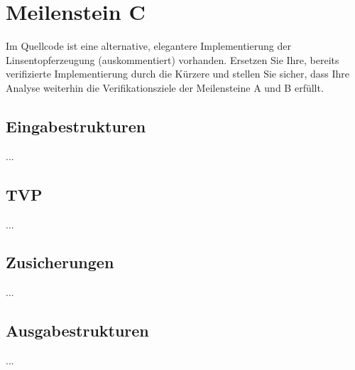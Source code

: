 \section{Meilenstein C}
Im Quellcode ist eine alternative, elegantere Implementierung der Linsentopferzeugung (auskommentiert) vorhanden. Ersetzen Sie Ihre, bereits verifizierte Implementierung durch die Kürzere und stellen Sie sicher, dass Ihre Analyse weiterhin die Verifikationsziele der Meilensteine A und B erfüllt.


\subsection{Eingabestrukturen}
...


\subsection{TVP}
...


\subsection{Zusicherungen}
...


\subsection{Ausgabestrukturen}
...